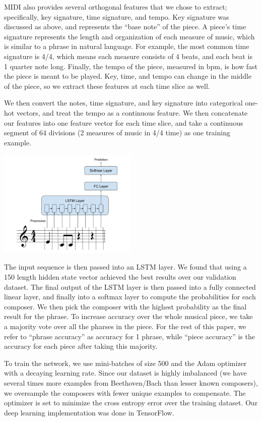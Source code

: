 \documentclass[11pt,a4paper]{article}
\begin{document}
MIDI also provides several orthogonal features that we chose to extract; specifically, key signature, time signature, and tempo. Key signature was discussed as above, and represents the ``base note'' of the piece. A piece's time signature represents the length and organization of each measure of music, which is similar to a phrase in natural language. For example, the most common time signature is 4/4, which means each measure consists of 4 beats, and each beat is 1 quarter note long. Finally, the tempo of the piece, measured in bpm, is how fast the piece is meant to be played. Key, time, and tempo can change in the middle of the piece, so we extract these features at each time slice as well.

We then convert the notes, time signature, and key signature into categorical one-hot vectors, and treat the tempo as a continuous feature. We then concatenate our features into one feature vector for each time slice, and take a continuous segment of 64 divisions (2 measures of music in 4/4 time) as one training example.

\includegraphics[width=0.5\textwidth]{Architecture.png}

The input sequence is then passed into an LSTM layer. We found that using a 150 length hidden state vector achieved the best results over our validation dataset. The final output of the LSTM layer is then passed into a fully connected linear layer, and finally into a softmax layer to compute the probabilities for each composer. We then pick the composer with the highest probability as the final result for the phrase. To increase accuracy over the whole musical piece, we take a majority vote over all the pharses in the piece. For the rest of this paper, we refer to ``phrase accuracy'' as accuracy for 1 phrase, while ``piece accuracy'' is the accuracy for each piece after taking this majority. 

To train the network, we use mini-batches of size 500 and the Adam optimizer with a decaying learning rate. Since our dataset is highly imbalanced (we have several times more examples from Beethoven/Bach than lesser known composers), we oversample the composers with fewer unique examples to compensate. The optimizer is set to minimize the cross entropy error over the training dataset. Our deep learning implementation was done in TensorFlow.
\end{document}
